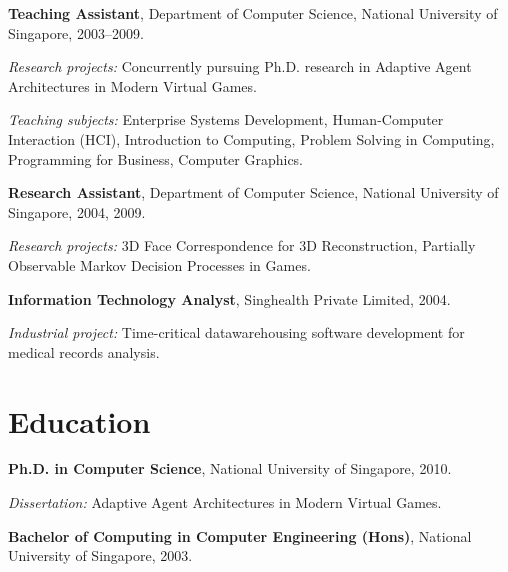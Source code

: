 \documentclass[10pt,a4paper]{article}
\renewenvironment{itemize}{
  \begin{list}{}{
    \setlength{\leftmargin}{1.5em}
    \setlength{\itemsep}{0.25em}
    \setlength{\parskip}{0pt}
    \setlength{\parsep}{0.25em}
  }
}{
  \end{list}
}
\begin{document}
\begin{itemize}
\item \textbf{Teaching Assistant}, Department of Computer Science, National University of Singapore,
    2003--2009.
    \begin{itemize}
        \item \textit{Research projects:} Concurrently pursuing Ph.D. research in Adaptive Agent Architectures in Modern Virtual Games.
        \item \textit{Teaching subjects:} Enterprise Systems Development, Human-Computer Interaction (HCI), Introduction to Computing, Problem Solving in Computing, Programming for Business, Computer Graphics.
    \end{itemize}

\item \textbf{Research Assistant}, Department of Computer Science, National University of Singapore,
    2004, 2009.
    \begin{itemize}
        \item \textit{Research projects:} 3D Face Correspondence for 3D Reconstruction, Partially Observable Markov Decision Processes in Games.
    \end{itemize}

\item \textbf{Information Technology Analyst}, Singhealth Private Limited,
    2004.
    \begin{itemize}
        \item \textit{Industrial project:} Time-critical datawarehousing software development for medical records analysis.
    \end{itemize}

\end{itemize}

\section*{Education}

\begin{itemize}
  \item \textbf{Ph.D. in Computer Science},
    National University of Singapore, 2010.
    \begin{itemize}
    \item \textit{Dissertation:}
      Adaptive Agent Architectures in Modern Virtual Games.
    \end{itemize}
  \item \textbf{Bachelor of Computing in Computer Engineering (Hons)},
    National University of Singapore, 2003.
\end{itemize}
\end{document}

